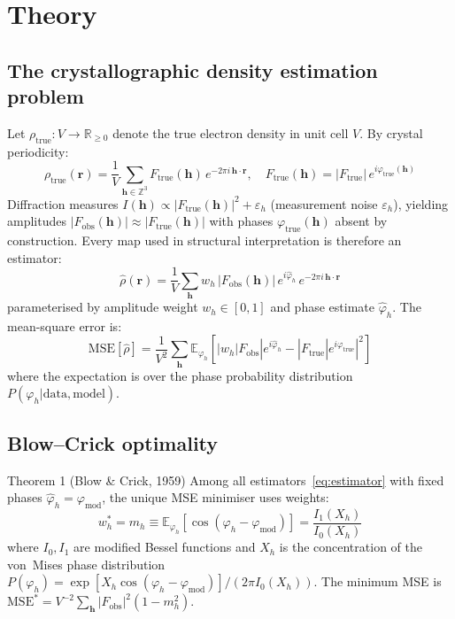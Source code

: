 \documentclass[10pt,twocolumn]{article}
\newcommand{\Fobs}{F_{\!\mathrm{obs}}}
\newcommand{\Ftrue}{F_{\!\mathrm{true}}}
\newcommand{\phimod}{\varphi_{\mathrm{mod}}}
\newcommand{\phitrue}{\varphi_{\mathrm{true}}}
\newcommand{\phih}{\varphi_h}
\newcommand{\mh}{m_h}
\newcommand{\Xh}{X_h}
\newcommand{\rhoT}{\rho_{\mathrm{true}}}
\newcommand{\Eop}{\mathbb{E}}
\newcommand{\boldh}{\mathbf{h}}
\newcommand{\boldr}{\mathbf{r}}
\begin{document}
\section{Theory}

\subsection{The crystallographic density estimation problem}

Let $\rhoT: V \to \mathbb{R}_{\geq 0}$ denote the true electron
density in unit cell $V$.  By crystal periodicity:
\begin{equation}
  \rhoT(\boldr)
  = \frac{1}{V}\sum_{\boldh \in \mathbb{Z}^3}
    \Ftrue(\boldh)\,e^{-2\pi i\,\boldh\cdot\boldr}, \quad
  \Ftrue(\boldh) = |\Ftrue|\,e^{i\phitrue(\boldh)}
  \label{eq:rho_true}
\end{equation}
Diffraction measures $I(\boldh) \propto |\Ftrue(\boldh)|^2 + \varepsilon_h$
(measurement noise $\varepsilon_h$), yielding amplitudes
$|\Fobs(\boldh)| \approx |\Ftrue(\boldh)|$ with phases
$\phitrue(\boldh)$ absent by construction.
Every map used in structural interpretation is therefore an estimator:
\begin{equation}
  \hat\rho(\boldr)
  = \frac{1}{V}\sum_{\boldh}
    w_h\,|\Fobs(\boldh)|\,e^{i\hat\varphi_h}\,
    e^{-2\pi i\,\boldh\cdot\boldr}
  \label{eq:estimator}
\end{equation}
parameterised by amplitude weight $w_h \in [0,1]$ and phase
estimate $\hat\varphi_h$.  The mean-square error is:
\begin{equation}
  \mathrm{MSE}[\hat\rho]
  = \frac{1}{V^2}\sum_{\boldh}
    \Eop_{\phih}\!\left[
      |w_h|\Fobs|e^{i\hat\varphi_h}
      - |\Ftrue|e^{i\phitrue}|^2
    \right]
  \label{eq:mse}
\end{equation}
where the expectation is over the phase probability distribution
$P(\phih | \mathrm{data}, \mathrm{model})$.

\subsection{Blow--Crick optimality}

\begin{mathbox}{Theorem 1 (Blow \& Crick, 1959)}
Among all estimators~\eqref{eq:estimator} with fixed phases
$\hat\varphi_h = \phimod$, the unique MSE minimiser uses weights:
\begin{equation}
  w_h^* = \mh \equiv
  \Eop_{\phih}\!\left[\cos(\phih - \phimod)\right]
  = \frac{I_1(\Xh)}{I_0(\Xh)}
  \label{eq:fom}
\end{equation}
where $I_0, I_1$ are modified Bessel functions and $\Xh$ is
the concentration of the von~Mises phase distribution
$P(\phih) = \exp[\Xh\cos(\phih-\phimod)] / (2\pi I_0(\Xh))$.
The minimum MSE is
$\mathrm{MSE}^* = V^{-2}\sum_\boldh |\Fobs|^2(1-\mh^2)$.
\end{mathbox}
\end{document}
